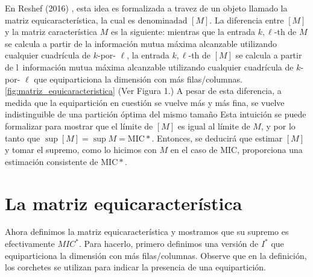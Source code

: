 	En Reshef (2016) \cite{Reshef2016}, esta idea es formalizada a travez de un objeto llamado la matriz equicaracter\'istica, la cual es denominadad $[M]$. La diferencia entre $[M]$ y la matriz caracter\'istica $M$ es la siguiente: mientras que la entrada $k, \ell$-th de $M$ se calcula a partir de la informaci\'on mutua m\'axima alcanzable utilizando cualquier cuadr\'icula de $k$-por- $\ell$, la entrada $k, \ell$-th de $[M]$ se calcula a partir de l\ informaci\'on mutua m\'axima alcanzable utilizando cualquier cuadr\'icula de $k$-por- $\ell$ que equiparticiona la dimensi\'on con m\'as filas/columnas. \ref{fig:matriz_equicaracteristica} (Ver Figura 1.) A pesar de esta diferencia, a medida que la equipartici\'on en cuesti\'on se vuelve m\'as y m\'as fina, se vuelve indistinguible de una partici\'on \'optima del mismo tama\~no Esta intuici\'on se puede formalizar para mostrar que el l\'imite de $[M]$ es igual al l\'imite de $M$, y por lo tanto que $\sup [M]=\sup M=\mathrm{MIC}*$. Entonces, se deducir\'a que estimar $[M]$ y tomar el supremo, como lo hicimos con $M$ en el caso de MIC, proporciona una estimaci\'on consistente de $\mathrm{MIC}*$.

	\section{La matriz equicaracter\'istica} 

	Ahora definimos la matriz equicaracter\'istica y mostramos que su supremo es efectivamente $MIC^*$. Para hacerlo, primero definimos una versi\'on de $I^*$ que equiparticiona la dimensi\'on con m\'as filas/columnas. Observe que en la definici\'on, los corchetes se utilizan para indicar la presencia de una equipartici\'on.

